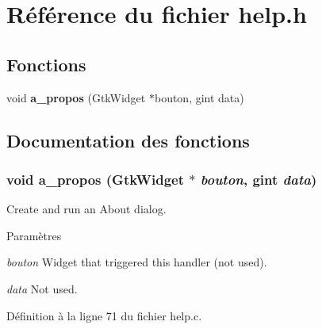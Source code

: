 \section{Référence du fichier help.h}
\label{help_8h}
\subsection*{Fonctions}
\begin{DoxyCompactItemize}
\item 
void {\bf a\_\-propos} (GtkWidget $\ast$bouton, gint data)
\end{DoxyCompactItemize}


\subsection{Documentation des fonctions}
\subsubsection[{a\_\-propos}]{\setlength{\rightskip}{0pt plus 5cm}void a\_\-propos (GtkWidget $\ast$ {\em bouton}, \/  gint {\em data})}\label{help_8h_a8236087b365d84362a2c5431468d1ba3}
Create and run an About dialog.


\begin{DoxyParams}{Paramètres}
\item[{\em bouton}]Widget that triggered this handler (not used). \item[{\em data}]Not used. \end{DoxyParams}


Définition à la ligne 71 du fichier help.c.

